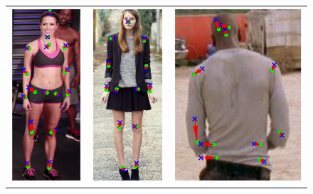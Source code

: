 \begin{figure}
    \begin{tabular}{ccc}
    \includegraphics[height=.65\columnwidth]{resources/Annotation_Correction/MotivativeAnnotation/MPII}
    &
    \includegraphics[height=.65\columnwidth]{resources/Annotation_Correction/MotivativeAnnotation/FashionPose}
    &
    \includegraphics[trim=50 0 50 0,clip,height=.65\columnwidth]{resources/Annotation_Correction/MotivativeAnnotation/FLIC}

\end{tabular}
\end{figure}
